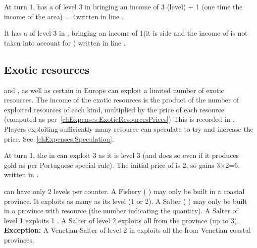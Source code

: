 \begin{exemple}
  At turn 1, \POR has a \COL of level 3 in 
  bringing an income of 3 (level) + 1 (one time the income of the
   area) = 4\ducats written in line
  .

  It has a \TP of level 3 in , bringing an income
  of 1\ducats (it is side \Facemoins and the income of
  \granderegionCotedor is not taken into account for \TP) written in
  line .
\end{exemple}

\subsection{Exotic resources}
\label{chIncomes:Exotic ressources}
\aparag \COL and \TP, as well as certain \MNU in Europe can exploit a
limited number of exotic resources.
\bparag The income of the exotic resources is the product of the number
of exploited resources of each kind, multiplied by the price of each
resource (computed as per~\ref{chExpenses:ExoticResourcesPrices})
\bparag This is recorded in .
\bparag Players exploiting sufficiently many resource can speculate to
try and increase the price. See~\ref{chExpenses:Speculation}.

\begin{exemple}
  At turn 1, the \TP in  can exploit 3 
  as it is level 3 (and does so even if it produces gold as per
  Portuguese special rule). The initial price of  is
  2\ducats, so \POR gains 3$\times$2=6\ducats, written in
  .
\end{exemple}

\aparag[Manufactures] \MNU can have only 2 levels per counter.
\bparag A Fishery ( \MNU) may only be built in a coastal
province. It exploits as many  as its level (1 or 2).
\bparag A Salter ( \MNU) may only be built in a province with
 resource (the number indicating the quantity).
\bparag A Salter of level 1 exploits 1 .
\bparag A Salter of level 2 exploits all  from the province (up to
3).
\bparag \textbf{Exception:} A Venetian Salter of level 2 in \provinceVeneto
exploits all the  from Venetian coastal provinces.

